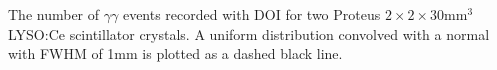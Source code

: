 \label{fig:confinement} The number of $\gamma\gamma$ events recorded with DOI for two Proteus $2\times2\times30$mm$^3$ LYSO:Ce scintillator crystals. A uniform distribution convolved with a normal with FWHM of 1mm is plotted as a dashed black line.